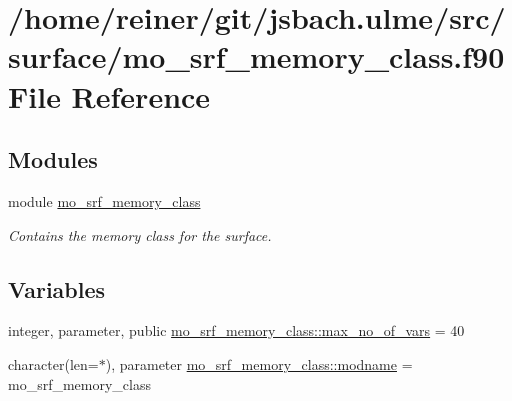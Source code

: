 \hypertarget{mo__srf__memory__class_8f90}{}\section{/home/reiner/git/jsbach.ulme/src/surface/mo\+\_\+srf\+\_\+memory\+\_\+class.f90 File Reference}
\label{mo__srf__memory__class_8f90}
\subsection*{Modules}
\begin{DoxyCompactItemize}
\item 
module \hyperlink{namespacemo__srf__memory__class}{mo\+\_\+srf\+\_\+memory\+\_\+class}
\begin{DoxyCompactList}\small\item\em Contains the memory class for the surface. \end{DoxyCompactList}\end{DoxyCompactItemize}
\subsection*{Variables}
\begin{DoxyCompactItemize}
\item 
integer, parameter, public \hyperlink{namespacemo__srf__memory__class_aad4af66f23616b09c838d1d25b33d13b}{mo\+\_\+srf\+\_\+memory\+\_\+class\+::max\+\_\+no\+\_\+of\+\_\+vars} = 40
\item 
character(len=$\ast$), parameter \hyperlink{namespacemo__srf__memory__class_a0e5b6ff2ea39b47afe54d1162df39955}{mo\+\_\+srf\+\_\+memory\+\_\+class\+::modname} = \textquotesingle{}mo\+\_\+srf\+\_\+memory\+\_\+class\textquotesingle{}
\end{DoxyCompactItemize}
